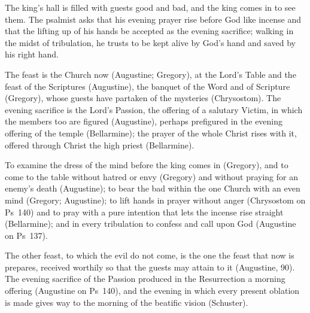 \begin{fourSenses}
\item[Literal.] The king's hall is filled with guests good and bad, and the
king comes in to see them. The psalmist asks that his evening prayer rise
before God like incense and that the lifting up of his hands be accepted as the
evening sacrifice; walking in the midst of tribulation, he trusts to be kept
alive by God's hand and saved by his right hand.

\item[Allegorical.] The feast is the Church now (Augustine; Gregory), at the
Lord's Table and the feast of the Scriptures (Augustine), the banquet of the
Word and of Scripture (Gregory), whose guests have partaken of the mysteries
(Chrysostom). The evening sacrifice is the
Lord's Passion, the offering of a salutary Victim, in which the members too
are figured (Augustine), perhaps prefigured in the evening offering of the
temple (Bellarmine); the prayer of the whole Christ rises with it, offered
through Christ the high priest (Bellarmine).

\item[Moral.] To examine the dress of the mind before the king comes in
(Gregory), and to come to the table without hatred or envy (Gregory) and
without praying for an enemy's death (Augustine); to bear the bad within the
one Church with an even mind (Gregory; Augustine); to lift hands in prayer
without anger (Chrysostom on Ps~140) and to pray with a pure intention that
lets the incense rise straight (Bellarmine); and in every tribulation to
confess and call upon God (Augustine on Ps~137).

\item[Anagogical.] The other feast, to which the evil do not come, is the one
the feast that now is prepares, received worthily so that the guests may
attain to it (Augustine,  90). The evening sacrifice of the Passion
produced in the Resurrection a morning offering (Augustine on Ps~140), and the
evening in which every present oblation is made gives way to the morning of
the beatific vision (Schuster).
\end{fourSenses}
